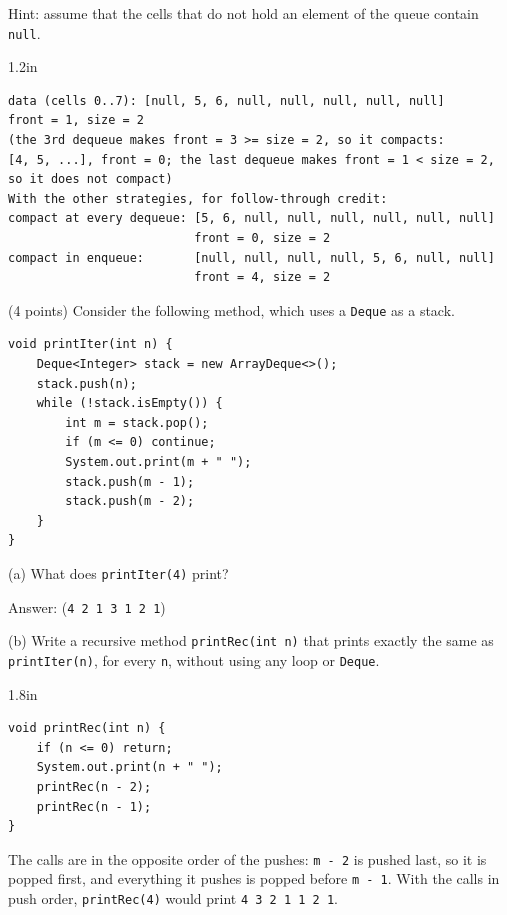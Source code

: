 \begin{question}
\begin{minipage}[t]{0.6\linewidth}
Hint: assume that the cells that do not hold an element of the queue contain \lstinline|null|.
\end{minipage}

\begin{answerspace}{1.2in}
\ifanswers
\begin{verbatim}
data (cells 0..7): [null, 5, 6, null, null, null, null, null]
front = 1, size = 2
(the 3rd dequeue makes front = 3 >= size = 2, so it compacts:
[4, 5, ...], front = 0; the last dequeue makes front = 1 < size = 2,
so it does not compact)
With the other strategies, for follow-through credit:
compact at every dequeue: [5, 6, null, null, null, null, null, null]
                          front = 0, size = 2
compact in enqueue:       [null, null, null, null, 5, 6, null, null]
                          front = 4, size = 2
\end{verbatim}
\fi
\end{answerspace}
\end{question}

\begin{question}
(4 points) Consider the following method, which uses a \lstinline|Deque| as a stack.

\begin{lstlisting}
void printIter(int n) {
    Deque<Integer> stack = new ArrayDeque<>();
    stack.push(n);
    while (!stack.isEmpty()) {
        int m = stack.pop();
        if (m <= 0) continue;
        System.out.print(m + " ");
        stack.push(m - 1);
        stack.push(m - 2);
    }
}
\end{lstlisting}

(a) What does \lstinline|printIter(4)| print?

Answer: \underline{\hspace{2.5in}} \ifanswers (\lstinline|4 2 1 3 1 2 1|)\fi

\bigskip
(b) Write a recursive method \lstinline|printRec(int n)| that prints exactly the same as \lstinline|printIter(n)|, for every \lstinline|n|, without using any loop or \lstinline|Deque|.

\begin{answerspace}{1.8in}
\ifanswers
\begin{lstlisting}
void printRec(int n) {
    if (n <= 0) return;
    System.out.print(n + " ");
    printRec(n - 2);
    printRec(n - 1);
}
\end{lstlisting}
The calls are in the opposite order of the pushes: \lstinline|m - 2| is pushed last, so it is popped first, and everything it pushes is popped before \lstinline|m - 1|.
With the calls in push order, \lstinline|printRec(4)| would print \lstinline|4 3 2 1 1 2 1|.
\fi
\end{answerspace}
\end{question}

